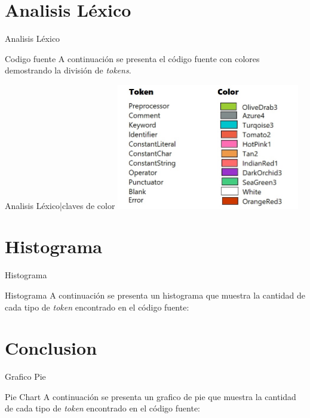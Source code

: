 \documentclass[10pt,xcolor={x11names}]{beamer}
\begin{document}
\section{Analisis Léxico}

\begin{frame}{Analisis Léxico}
        \begin{alertblock}{Codigo fuente}
            A continuación se presenta el código fuente con colores demostrando la división de \textit{tokens}.
            \end{alertblock}
        
\end{frame}

\begin{frame}{Analisis Léxico|claves de color}
\includegraphics[width=8cm]{colors}
\end{frame}



\section{Histograma}
\begin{frame}{Histograma}
        \begin{alertblock}{Histograma}
            A continuación se presenta un histograma que muestra la cantidad de cada tipo de \textit{token} encontrado en el código fuente:
            \end{alertblock}
\end{frame}


\section{Conclusion}
\begin{frame}{Grafico Pie}
        \begin{alertblock}{Pie Chart}
            A continuación se presenta un grafico de pie que muestra la cantidad de cada tipo de \textit{token} encontrado en el código fuente:
            \end{alertblock}
\end{frame}
\end{document}
